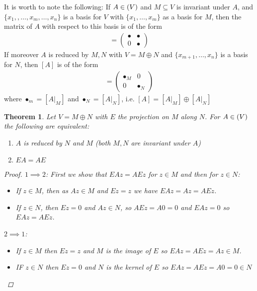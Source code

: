 \documentclass[10pt,twoside,openany,final]{memoir}
\theoremstyle{break}
\newtheorem{theorem}[section]{Theorem}
\theoremstyle{Break}
\let\End\relax
\DeclareMathOperator{\End}{End}
\begin{document}
It is worth to note the following: If $A\in \End(V)$ and $M\subseteq V$ is invariant under $A$, and $\{x_1,,\dots,x_m,\dots,x_n\}$ is a basis for $V$ with $\{x_1,\dots,x_m\}$ as a basis for $M$, then the matrix of $A$ with respect to this basis is of the form
\begin{align*}
	[A]=\begin{pmatrix}
		\bullet & \bullet \\
		0 & \bullet
	\end{pmatrix}
\end{align*}
If moreover $A$ is reduced by $M,N$ with $V=M \oplus N$ and $\{x_{m+1},\dots,x_n\}$ is a basis for $N$, then $[A]$ is of the form
\begin{align*}
	[A]= \begin{pmatrix}
		\bullet_M & 0 \\
		0 & \bullet_N
	\end{pmatrix}
\end{align*}
where $\bullet_m=\left[ A\big|_{M}  \right]$ and $\bullet_N=\left[A\big|_{ N}  \right]$, i.e. $[A]=\left[ A \big|_M \right] \oplus \left[ A \big|_N \right]$

\begin{theorem}
	Let $V=M \oplus N$ with $E$ the projection on $M$ along $N$. For $A \in \End(V)$ the following are equivalent:
	\begin{enumerate}
		\item $A$ is reduced by $N$ and $M$ (both $M,N$ are invariant under $A$)
		\item $EA=AE$
	\end{enumerate}
	\begin{proof}
		$1 \implies 2$: First we show that $EAz=AEz$ for $z \in M$ and then for $z \in N$: 
\begin{itemize}
	\item If $z \in M$, then as $Az \in M$ and $Ez=z$ we have $EAz=Az=AEz$.
	\item If $z \in N$, then $Ez=0$ and $Az \in N$, so $AEz=A0=0$ and $EAz=0$ so $EAz=AEz$.
\end{itemize}	
		$2 \implies 1$:
\begin{itemize}
	\item If $z \in M$ then $Ez=z$ and $M$ is the image of $E$ so $EAz=AEz=Az \in M$.
	\item IF $z \in N$ then $Ez=0$ and $N$ is the kernel of $E$ so $EAz=AEz=A0=0 \in N$
\end{itemize}
	\end{proof}
\end{theorem}
\end{document}
